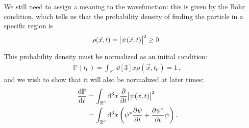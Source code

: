 \documentclass[main.tex]{subfiles}
\begin{document}
We still need to assign a meaning to the wavefunction: this is given by the Bohr condition, which tells us that the probability density of finding the particle in a specific  region is
%
\begin{align}
\rho (\vec{x}, t) = \abs{\psi (\vec{x}, t)}^2 \geq 0 
\,.
\end{align}

This probability density must be normalized as an initial condition:
%
\begin{align}
\mathbb{P} (t_0 ) = \int_{\mathbb{R}^3} \dd[3]{x} \rho (\vec{x}, t_0 ) = 1
\,,
\end{align}
%
and we wish to show that it will also be normalized at later times: 
%
\begin{subequations}
\begin{align}
\dv{\mathbb{P}}{t} &= 
\int_{\mathbb{R}^3} \dd[3]{x} \pdv{}{t} \abs{\psi (\vec{x}, t)}^2  \\
&= \int_{\mathbb{R}^3} \dd[3]{x} \qty(\psi^{*} \pdv{\psi }{t} + \pdv{\psi^{*}}{t} \psi )
\,.
\end{align}
\end{subequations}
\end{document}
